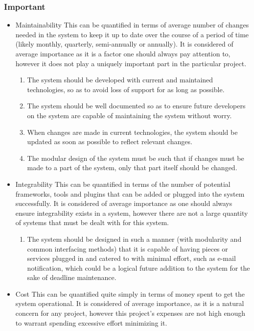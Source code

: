 \documentclass[hidelinks,a4paper,12pt]{article}
\begin{document}
			\subsubsection{Important}
			\begin{itemize}
				\item Maintainability
				This can be quantified in terms of average number of changes needed in the system to keep it up to date over the course of a period of time (likely monthly, quarterly, semi-annually or annually). It is considered of average importance as it is a factor one should always pay attention to, however it does not play a uniquely important part in the particular project. 
				\begin{enumerate}
					\item The system should be developed with current and maintained technologies, so as to avoid loss of support for as long as possible.
					\item The system should be well documented so as to ensure future developers on the system are capable of maintaining the system without worry.
					\item When changes are made in current technologies, the system should be updated as soon as possible to reflect relevant changes.
					\item The modular design of the system must be such that if changes must be made to a part of the system, only that part itself should be changed.
				\end{enumerate}
				\item Integrability
				This can be quantified in terms of the number of potential frameworks, tools and plugins that can be added or plugged into the system successfully. It is considered of average importance as one should always ensure integrability exists in a system, however there are not a large quantity of systems that must be dealt with for this system.
				\begin{enumerate}
					\item The system should be designed in such a manner (with modularity and common interfacing methods) that it is capable of having pieces or services plugged in and catered to with minimal effort, such as e-mail notification, which could be a logical future addition to the system for the sake of deadline maintenance.
				\end{enumerate}
				\item Cost
				This can be quantified quite simply in terms of money spent to get the system operational. It is considered of average importance, as it is a natural concern for any project, however this project's expenses are not high enough to warrant spending excessive effort minimizing it.

\end{itemize}
\end{document}
